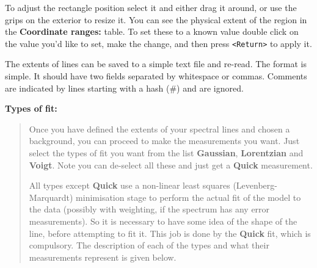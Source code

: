 \documentclass[twoside,11pt]{article}
\renewcommand{\_}{\texttt{\symbol{95}}}
\newcommand{\labelitem}[1]{\textbf{#1}}
\newcommand{\hitext}[1]{\texttt{#1}}
\newcommand{\subheading}[1]{\textbf{\large{#1}}}
\begin{document}
To adjust the rectangle position select it and either drag it around,
or use the grips on the exterior to resize it. You can see the
physical extent of the region in the \labelitem{Coordinate ranges:}
table. To set these to a known value double click on the value you'd
like to set, make the change, and then press \hitext{<Return>} to
apply it.

The extents of lines can be saved to a simple text file and
re-read. The format is simple. It should have two fields separated by
whitespace or commas. Comments are indicated by lines starting with a
hash (\#) and are ignored.

\subheading{Types of fit:}
\begin{quote}
 Once you have defined the extents of your spectral lines and chosen a
 background, you can proceed to make the measurements you want. Just
 select the types of fit you want from the list \labelitem{Gaussian},
 \labelitem{Lorentzian} and \labelitem{Voigt}. Note you can de-select
 all these and just get a \labelitem{Quick} measurement.

 All types except \labelitem{Quick} use a non-linear least squares
 (Levenberg-Marquardt) minimisation stage to perform the actual fit of
 the model to the data (possibly with weighting, if the spectrum has
 any error measurements). So it is necessary to have some idea of the
 shape of the line, before attempting to fit it. This job is done by
 the \labelitem{Quick} fit, which is compulsory. The description of
 each of the types and what their measurements represent is given
 below.


\end{quote}
\end{document}
